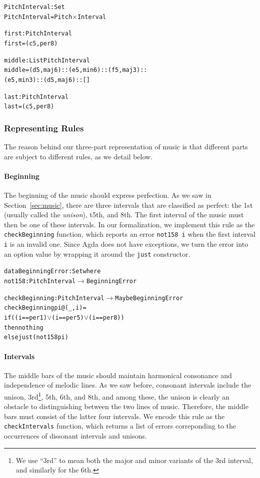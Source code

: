 \begin{alltt}
PitchInterval : Set
PitchInterval = Pitch \(\times\) Interval
  
first : PitchInterval
first = (c 5 , per8)

middle : List PitchInterval
middle = (d 5 , maj6) :: (e 5 , min6) :: (f 5 , maj3) ::
         (e 5 , min3) :: (d 5 , maj6) :: []

last : PitchInterval
last = (c 5 , per8)
\end{alltt}

\subsubsection{Representing Rules}

The reason behind our three-part representation of music is that
different parts are subject to different rules, as we detail below.

\paragraph{Beginning}

The beginning of the music should express perfection.
As we saw in Section~\ref{sec:music}, there are three intervals that
are classified as perfect: the 1st (usually called the \emph{unison}),
t5th, and 8th.
The first interval of the music must then be one of these intervals.
In our formalization, we implement this rule as the
\texttt{checkBeginning} function, which reports an error
\texttt{not158 i} when the first interval \texttt{i} is an invalid one.
Since Agda does not have exceptions, we turn the error into an option
value by wrapping it around the \texttt{just} constructor.

\begin{alltt}
data BeginningError : Set where
  not158   : PitchInterval \(\rightarrow\) BeginningError
  
checkBeginning : PitchInterval \(\rightarrow\) Maybe BeginningError
checkBeginning pi@(_ , i) =
  if ((i == per1) \(\vee\) (i == per5) \(\vee\) (i == per8))
  then nothing
  else just (not158 pi)
\end{alltt}

\paragraph{Intervals}

The middle bars of the music should maintain harmonical consonance
and independence of melodic lines.
As we saw before, consonant intervals include the unison,
3rd\footnote{We use ``3rd'' to mean both the major and minor variants
of the 3rd interval, and similarly for the 6th.}, 5th, 6th, and 8th,
and among these, the unison is clearly an obstacle to distinguishing
between the two lines of music.
Therefore, the middle bars must consist of the latter four intervals.
We encode this rule as the \texttt{checkIntervals} function, which
returns a list of errors correponding to the occurrences of dissonant
intervals and unisons.


